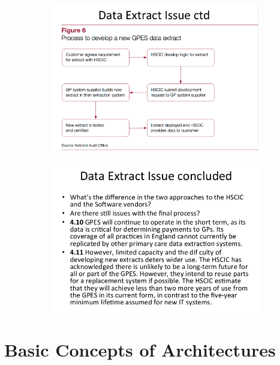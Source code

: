 \documentclass[a4paper]{report}
\begin{document}
\begin{figure}[H]
\centering
\begin{subfigure}{1\textwidth}
  \includegraphics[width=1\linewidth]
  {images/1-issues.png}
\end{subfigure}
\end{figure}

\begin{figure}[H]
\centering
\begin{subfigure}{1\textwidth}
  \includegraphics[width=1\linewidth]
  {images/1-issues-concluded.png}
\end{subfigure}
\end{figure}
\newpage

\chapter{Basic Concepts of Architectures}
\end{document}
